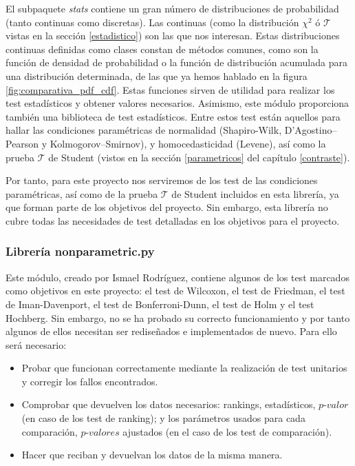 El subpaquete \textit{stats} contiene un gran número de distribuciones de probabilidad (tanto continuas como discretas). Las continuas (como la distribución $\chi^2$ ó $\mathcal{T}$ vistas en la sección \ref{estadistico}) son las que nos interesan. Estas distribuciones continuas definidas como clases constan de métodos comunes, como son la función de densidad de probabilidad o la función de distribución acumulada para una distribución determinada, de las que ya hemos hablado en la figura \ref{fig:comparativa_pdf_cdf}. Estas funciones sirven de utilidad para realizar los test estadísticos y obtener valores necesarios. Asimismo, este módulo proporciona también una biblioteca de test estadísticos. Entre estos test están aquellos para hallar las condiciones paramétricas de normalidad (Shapiro-Wilk, D’Agostino–Pearson y Kolmogorov–Smirnov), y homocedasticidad (Levene), así como la prueba $\mathcal{T}$ de Student (vistos en la sección \ref{parametricos} del capítulo \ref{contraste}). 

Por tanto, para este proyecto nos serviremos de los test de las condiciones paramétricas, así como de la prueba $\mathcal{T}$ de Student incluidos en esta librería, ya que forman parte de los objetivos del proyecto. Sin embargo, esta librería no cubre todas las necesidades de test detalladas en los objetivos para el proyecto.
 
\subsubsection{\textbf{Librería nonparametric.py}} \label{nonparametric}
Este módulo, creado por Ismael Rodríguez, contiene algunos de los test marcados como objetivos en este proyecto: el test de Wilcoxon, el test de Friedman, el test de Iman-Davenport, el test de Bonferroni-Dunn, el test de Holm y el test Hochberg. Sin embargo, no se ha probado su correcto funcionamiento y por tanto algunos de ellos necesitan ser rediseñados e implementados de nuevo. Para ello será necesario:

\begin{itemize}
\item Probar que funcionan correctamente mediante la realización de test unitarios y corregir los fallos encontrados.
\item Comprobar que devuelven los datos necesarios: rankings, estadísticos, $\textit{p-valor}$ (en caso de los test de ranking); y los parámetros usados para cada comparación, $\textit{p-valor}es$ ajustados (en el caso de los test de comparación).
\item Hacer que reciban y devuelvan los datos de la misma manera. 
\end{itemize}

